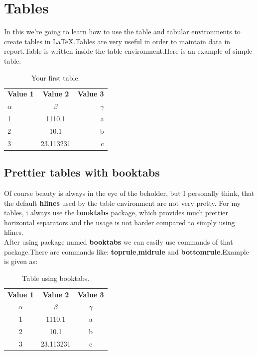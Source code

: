 \documentclass{article}
\begin{document}
\section{Tables}
In this we're going to learn how to use the table and tabular environments to create tables in LaTeX.Tables are very useful in order to maintain data in report.Table is written inside the table environment.Here is an example of simple table:

\begin{table}[h!]
  \begin{center}
    \caption{Your first table.}
    \label{tab:table1}
    \begin{tabular}{l|c|r}
      \textbf{Value 1} & \textbf{Value 2} & \textbf{Value 3}\\
      $\alpha$ & $\beta$ & $\gamma$ \\
      \hline
      1 & 1110.1 & a\\
      2 & 10.1 & b\\
      3 & 23.113231 & c\\
    \end{tabular}
  \end{center}
\end{table}

\subsection{Prettier tables with booktabs}
Of course beauty is always in the eye of the beholder, but I personally think, that the default \textbf{hlines} used by the table environment are not very pretty. For my tables, i always use the \textbf{booktabs} package, which provides much prettier horizontal separators and the usage is not harder compared to simply using hlines.\\
After using package named \textbf{booktabs} we can easily use commands of that package.There are commands like: \textbf{toprule},\textbf{midrule} and \textbf{bottomrule}.Example is given as: 
\newpage
\begin{table}[h!]
  \begin{center}
    \caption{Table using booktabs.}
    \label{tab:table1}
    \begin{tabular}{c|c|c}
      \toprule
      \textbf{Value 1} & \textbf{Value 2} & \textbf{Value 3}\\
      $\alpha$ & $\beta$ & $\gamma$ \\
      \midrule
      1 & 1110.1 & a\\
      2 & 10.1 & b\\
      3 & 23.113231 & c\\
      \bottomrule
    \end{tabular}
  \end{center}
\end{table}
\end{document}
